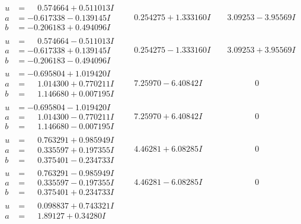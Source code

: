 \documentclass[1p]{elsarticle_modified}
\theoremstyle{definition}
\begin{document}
$$\begin{array}{c|c|c}
\begin{aligned}
u &= \phantom{-}0.574664 + 0.511013 I \\
a &= -0.617338 - 0.139145 I \\
b &= -0.206183 + 0.494096 I\end{aligned}
 & \phantom{-}0.254275 + 1.333160 I & \phantom{-}3.09253 - 3.95569 I \\ \hline\begin{aligned}
u &= \phantom{-}0.574664 - 0.511013 I \\
a &= -0.617338 + 0.139145 I \\
b &= -0.206183 - 0.494096 I\end{aligned}
 & \phantom{-}0.254275 - 1.333160 I & \phantom{-}3.09253 + 3.95569 I \\ \hline\begin{aligned}
u &= -0.695804 + 1.019420 I \\
a &= \phantom{-}1.014300 + 0.770211 I \\
b &= \phantom{-}1.146680 + 0.007195 I\end{aligned}
 & \phantom{-}7.25970 - 6.40842 I & \phantom{-0.000000 } 0 \\ \hline\begin{aligned}
u &= -0.695804 - 1.019420 I \\
a &= \phantom{-}1.014300 - 0.770211 I \\
b &= \phantom{-}1.146680 - 0.007195 I\end{aligned}
 & \phantom{-}7.25970 + 6.40842 I & \phantom{-0.000000 } 0 \\ \hline\begin{aligned}
u &= \phantom{-}0.763291 + 0.985949 I \\
a &= \phantom{-}0.335597 + 0.197355 I \\
b &= \phantom{-}0.375401 - 0.234733 I\end{aligned}
 & \phantom{-}4.46281 + 6.08285 I & \phantom{-0.000000 } 0 \\ \hline\begin{aligned}
u &= \phantom{-}0.763291 - 0.985949 I \\
a &= \phantom{-}0.335597 - 0.197355 I \\
b &= \phantom{-}0.375401 + 0.234733 I\end{aligned}
 & \phantom{-}4.46281 - 6.08285 I & \phantom{-0.000000 } 0 \\ \hline\begin{aligned}
u &= \phantom{-}0.098837 + 0.743321 I \\
a &= \phantom{-}1.89127 + 0.34280 I \\

\end{aligned}
\end{array}$$
\end{document}
